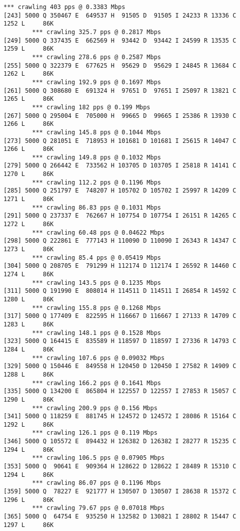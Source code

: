 \documentclass[11pt]{article}
\begin{document}
\begin{lstlisting}[label=app-trace,caption=Output of Homework 1]
        *** crawling 403 pps @ 0.3383 Mbps
[243] 5000 Q 350467 E  649537 H  91505 D  91505 I 24233 R 13336 C  1252 L     86K
        *** crawling 325.7 pps @ 0.2817 Mbps
[249] 5000 Q 337435 E  662569 H  93442 D  93442 I 24599 R 13535 C  1259 L     86K
        *** crawling 278.6 pps @ 0.2587 Mbps
[255] 5000 Q 322379 E  677625 H  95629 D  95629 I 24845 R 13684 C  1262 L     86K
        *** crawling 192.9 pps @ 0.1697 Mbps
[261] 5000 Q 308680 E  691324 H  97651 D  97651 I 25097 R 13821 C  1265 L     86K
        *** crawling 182 pps @ 0.199 Mbps
[267] 5000 Q 295004 E  705000 H  99665 D  99665 I 25386 R 13930 C  1266 L     86K
        *** crawling 145.8 pps @ 0.1044 Mbps
[273] 5000 Q 281051 E  718953 H 101681 D 101681 I 25615 R 14047 C  1266 L     86K
        *** crawling 149.8 pps @ 0.1032 Mbps
[279] 5000 Q 266442 E  733562 H 103705 D 103705 I 25818 R 14141 C  1270 L     86K
        *** crawling 112.2 pps @ 0.1196 Mbps
[285] 5000 Q 251797 E  748207 H 105702 D 105702 I 25997 R 14209 C  1271 L     86K
        *** crawling 86.83 pps @ 0.1031 Mbps
[291] 5000 Q 237337 E  762667 H 107754 D 107754 I 26151 R 14265 C  1272 L     86K
        *** crawling 60.48 pps @ 0.04622 Mbps
[298] 5000 Q 222861 E  777143 H 110090 D 110090 I 26343 R 14347 C  1273 L     86K
        *** crawling 85.4 pps @ 0.05419 Mbps
[304] 5000 Q 208705 E  791299 H 112174 D 112174 I 26592 R 14460 C  1274 L     86K
        *** crawling 143.5 pps @ 0.1235 Mbps
[311] 5000 Q 191990 E  808014 H 114511 D 114511 I 26854 R 14592 C  1280 L     86K
        *** crawling 155.8 pps @ 0.1268 Mbps
[317] 5000 Q 177409 E  822595 H 116667 D 116667 I 27133 R 14709 C  1283 L     86K
        *** crawling 148.1 pps @ 0.1528 Mbps
[323] 5000 Q 164415 E  835589 H 118597 D 118597 I 27336 R 14793 C  1284 L     86K
        *** crawling 107.6 pps @ 0.09032 Mbps
[329] 5000 Q 150446 E  849558 H 120450 D 120450 I 27582 R 14909 C  1288 L     86K
        *** crawling 166.2 pps @ 0.1641 Mbps
[335] 5000 Q 134200 E  865804 H 122557 D 122557 I 27853 R 15057 C  1290 L     86K
        *** crawling 200.9 pps @ 0.156 Mbps
[341] 5000 Q 118259 E  881745 H 124572 D 124572 I 28086 R 15164 C  1292 L     86K
        *** crawling 126.1 pps @ 0.119 Mbps
[346] 5000 Q 105572 E  894432 H 126382 D 126382 I 28277 R 15235 C  1294 L     86K
        *** crawling 106.5 pps @ 0.07905 Mbps
[353] 5000 Q  90641 E  909364 H 128622 D 128622 I 28489 R 15310 C  1294 L     86K
        *** crawling 86.07 pps @ 0.1196 Mbps
[359] 5000 Q  78227 E  921777 H 130507 D 130507 I 28638 R 15372 C  1296 L     86K
        *** crawling 79.67 pps @ 0.07018 Mbps
[365] 5000 Q  64754 E  935250 H 132582 D 130821 I 28802 R 15447 C  1297 L     86K

\end{lstlisting}
\end{document}
